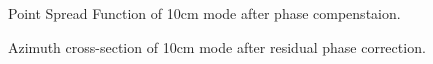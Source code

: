 \begin{figure}[ht!]
\begin{center}
 \caption{Point Spread Function of 10cm mode after phase compenstaion.}
 \label{fg:10cmPSFBalanced}
 \end{center}
\end{figure}
\begin{figure}[ht!]
\begin{center}
 \caption{Azimuth cross-section of 10cm mode after residual phase correction.}
 \label{fg:azimuthCross10}
 \end{center}
\end{figure}
